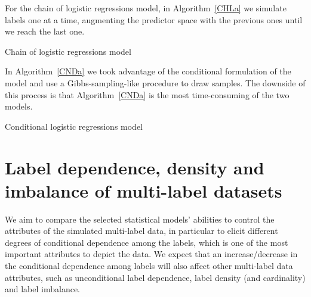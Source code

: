 \documentclass[review]{elsarticle}
\begin{document}
For the chain of logistic regressions model, in Algorithm~\ref{CHLa} we simulate labels one at a time, augmenting the predictor space with the previous ones until we reach the last one.
\begin{algorithm}[H]
\caption{Chain of logistic regressions model}\label{CHLa}
\begin{algorithmic}[1]
\EndFor
\end{algorithmic}
\end{algorithm}

In Algorithm~\ref{CNDa} we took advantage of the conditional formulation of the model and use a Gibbs-sampling-like procedure to draw samples. The downside of this process is that Algorithm~\ref{CNDa} is the most time-consuming of the two models.
\begin{algorithm}[H]
\caption{Conditional logistic regressions model}\label{CNDa}
\begin{algorithmic}[1]
\Repeat
\end{algorithmic}
\end{algorithm}


\section{Label dependence, density and imbalance of multi-label datasets}\label{s:attributes}

We aim to compare the selected statistical models' abilities to control the attributes of the simulated multi-label data, in particular to elicit different degrees of conditional dependence among the labels, which is one of the most important attributes to depict the data. We expect that an increase/decrease in the conditional dependence among labels will also affect other multi-label data attributes, such as unconditional label dependence, label density (and cardinality) and label imbalance.
\end{document}
